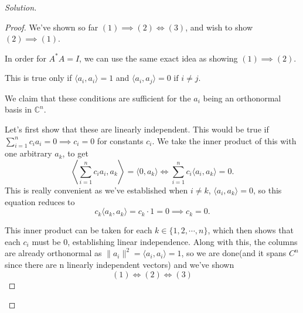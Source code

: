 \documentclass[11pt]{article}
\newcommand{\1}{\mathbf{1}}
\theoremstyle{definition}
\newenvironment{solution}{\begin{proof}[Solution]}{\end{proof}}
\begin{document}
\begin{solution}
\begin{proof}
        \par We've shown so far \((1) \implies (2) \iff (3)\), and wish to show \((2) \implies (1)\).

        \par In order for \(A^*A = I\), we can use the same exact idea as showing \((1) \implies (2)\).

        \par This is true only if \(\langle a_i, a_i \rangle = 1\) and \(\langle a_i, a_j \rangle = 0
        \text{ if } i \ne j.\)

        \par We claim that these conditions are sufficient for the \(a_i\) being an orthonormal basis
        in \(\mathbb{C}^n\).

        \par Let's first show that these are linearly independent.
        This would be true if \(\sum_{i=1}^{n} c_i a_i = 0 \implies c_i = 0\) for constants \(c_i\).
        We take the inner product of this with one arbitrary \(a_k\), to get
        \[
        \left\langle \sum_{i=1}^{n} c_i a_i, a_k \right\rangle
        = \langle 0, a_k \rangle
        \iff \sum_{i=1}^{n} c_i \langle a_i, a_k \rangle = 0.
        \]
        This is really convenient as we've established when \(i \ne k\), \(\langle a_i, a_k \rangle
        = 0\), so this equation reduces to
        \[
        c_k \langle a_k, a_k \rangle = c_k \cdot 1 = 0
        \implies c_k = 0.
        \]

        \par This inner product can be taken for each \(k \in \{1, 2, \cdots, n\}\), which then
        shows that each \(c_i\) must be \(0\), establishing linear independence.
        Along with this, the columns are already orthonormal as
        \(\|a_i\|^2 = \langle a_i, a_i\rangle = 1\), so we are done(and it spans $C^n$
        since there are n linearly independent vectors) and we've shown $$(1) \iff (2)
        \iff (3)$$
    \end{proof}
\end{solution}
\end{document}
